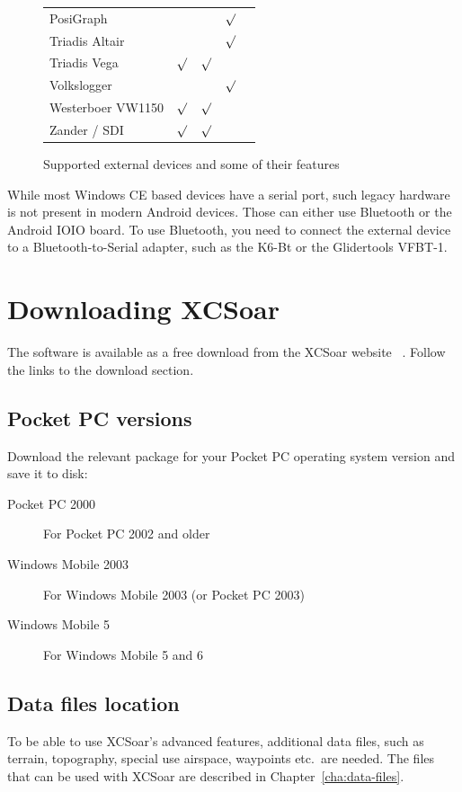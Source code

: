 \begin{figure}
\begin{tabular}{l|cccc}
PosiGraph &&& $\surd$ \\

Triadis Altair &&& $\surd$ \\

Triadis Vega & $\surd$ & $\surd$ \\

Volkslogger &&& $\surd$ \\

Westerboer VW1150 & $\surd$ & $\surd$ \\

Zander / SDI & $\surd$ & $\surd$ \\

\end{tabular}
\caption{Supported external devices and some of their features}
\end{figure}

While most Windows CE based devices have a serial port, such legacy
hardware is not present in modern Android devices.  Those can either
use Bluetooth or the Android IOIO board.  To use Bluetooth, you need
to connect the external device to a Bluetooth-to-Serial adapter, such
as the K6-Bt or the Glidertools VFBT-1.

\section{Downloading XCSoar}
The software is available as a free download from the XCSoar website
~\xcsoarwebsite. Follow the links to the download section.

\subsection*{Pocket PC versions}
Download the relevant package for your Pocket PC operating system
version and save it to disk:
\begin{description}
\item[Pocket PC 2000] For Pocket PC 2002 and older
\item[Windows Mobile 2003] For Windows Mobile 2003 (or Pocket PC 2003)
\item[Windows Mobile 5] For Windows Mobile 5 and 6
\end{description}

\subsection*{Data files location}
To be able to use XCSoar's advanced features, additional data files, such as
terrain, topography, special use airspace, waypoints etc.\ are needed. The files
that can be used with XCSoar are described in Chapter~\ref{cha:data-files}.

